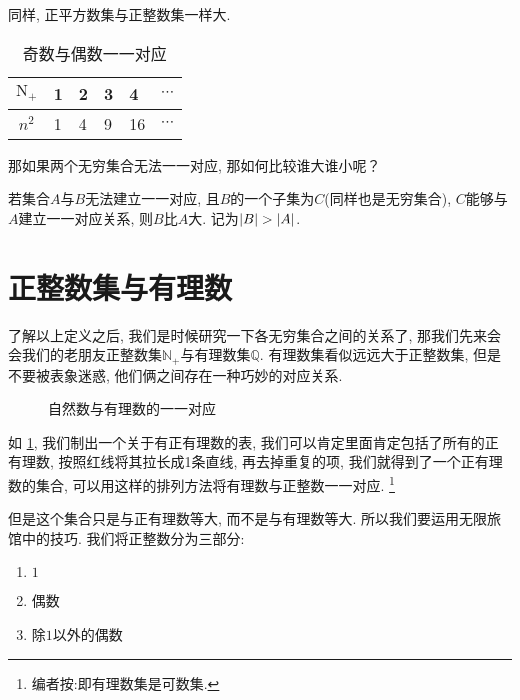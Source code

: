 同样, 正平方数集与正整数集一样大.

\begin{table}[!h]
  \centering
    \begin{tabular}{c|lllll}
      \toprule
      $\mathrm N_+$ & 1 & 2 & 3 & 4  & $\cdots$ \\
      \midrule
      $n^2$         & 1 & 4 & 9 & 16 & $\cdots$ \\
      \bottomrule
    \end{tabular}
    \caption{奇数与偶数一一对应}
\end{table}

那如果两个无穷集合无法一一对应, 那如何比较谁大谁小呢？

\begin{definition}
  若集合$A$与$B$无法建立一一对应, 且$B$的一个子集为$C$(同样也是无穷集合), $C$能够与$A$建立一一对应关系, 则$B$比$A$大.
  记为$\left\lvert B \right\rvert > \left\lvert A \right\rvert$.
\end{definition}

\section{正整数集与有理数}

了解以上定义之后, 我们是时候研究一下各无穷集合之间的关系了,
那我们先来会会我们的老朋友正整数集$\mathbb N_+$与有理数集$\mathbb Q$.
有理数集看似远远大于正整数集, 但是不要被表象迷惑, 他们俩之间存在一种巧妙的对应关系.

\begin{figure}[htbp]
  \centering
    
    \caption{自然数与有理数的一一对应}
    \label{fig:bijection}
\end{figure}

如 \cref{fig:bijection}, 我们制出一个关于有正有理数的表, 我们可以肯定里面肯定包括了所有的正有理数,
按照红线将其拉长成1条直线, 再去掉重复的项,
我们就得到了一个正有理数的集合, 可以用这样的排列方法将有理数与正整数一一对应.
\footnote{编者按:即有理数集是可数集. }

但是这个集合只是与正有理数等大, 而不是与有理数等大.
所以我们要运用无限旅馆中的技巧.
我们将正整数分为三部分:

\begin{enumerate}
  \item \label{enum:1} ${1}$
  \item \label{enum:2} 偶数
  \item \label{enum:3} 除$1$以外的偶数
\end{enumerate}

